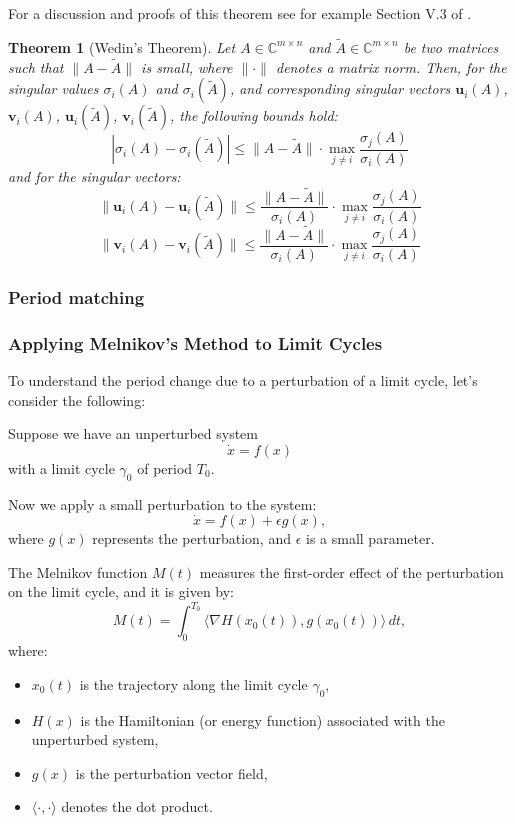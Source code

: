 \documentclass{article}
\newtheorem{theorem}{Theorem}
\theoremstyle{definition}
\theoremstyle{remark}
\newcounter{ct}
\begin{document}
For a discussion and proofs of this theorem see for example Section V.3 of \citet{stewart1990matrix}.


\begin{theorem}[Wedin's Theorem]
Let \( A \in \mathbb{C}^{m \times n} \) and \( \tilde{A} \in \mathbb{C}^{m \times n} \) be two matrices such that \( \| A - \tilde{A} \| \) is small, where \( \| \cdot \| \) denotes a matrix norm. Then, for the singular values \( \sigma_i(A) \) and \( \sigma_i(\tilde{A}) \), and corresponding singular vectors \( \mathbf{u}_i(A) \), \( \mathbf{v}_i(A) \), \( \mathbf{u}_i(\tilde{A}) \), \( \mathbf{v}_i(\tilde{A}) \), the following bounds hold:
\[
\left| \sigma_i(A) - \sigma_i(\tilde{A}) \right| \leq \| A - \tilde{A} \| \cdot \max_{j \neq i} \frac{\sigma_j(A)}{\sigma_i(A)}
\]
and for the singular vectors:
\[
\| \mathbf{u}_i(A) - \mathbf{u}_i(\tilde{A}) \| \leq \frac{\| A - \tilde{A} \|}{\sigma_i(A)} \cdot \max_{j \neq i} \frac{\sigma_j(A)}{\sigma_i(A)}
\]
\[
\| \mathbf{v}_i(A) - \mathbf{v}_i(\tilde{A}) \| \leq \frac{\| A - \tilde{A} \|}{\sigma_i(A)} \cdot \max_{j \neq i} \frac{\sigma_j(A)}{\sigma_i(A)}
\]
\end{theorem}



\subsubsection{Period matching}
\subsubsection{Applying Melnikov’s Method to Limit Cycles}

To understand the period change due to a perturbation of a limit cycle, let’s consider the following:

Suppose we have an unperturbed system
\[
\dot{x} = f(x)
\]
with a limit cycle \(\gamma_0\) of period \(T_0\).

Now we apply a small perturbation to the system:
\[
\dot{x} = f(x) + \epsilon g(x),
\]
where \(g(x)\) represents the perturbation, and \(\epsilon\) is a small parameter.

The Melnikov function \(M(t)\) measures the first-order effect of the perturbation on the limit cycle, and it is given by:
\[
M(t) = \int_0^{T_0} \langle \nabla H(x_0(t)), g(x_0(t)) \rangle \, dt,
\]
where:
\begin{itemize}
    \item \(x_0(t)\) is the trajectory along the limit cycle \(\gamma_0\),
    \item \(H(x)\) is the Hamiltonian (or energy function) associated with the unperturbed system,
    \item \(g(x)\) is the perturbation vector field,
    \item \(\langle \cdot, \cdot \rangle\) denotes the dot product.
\end{itemize}
\end{document}
